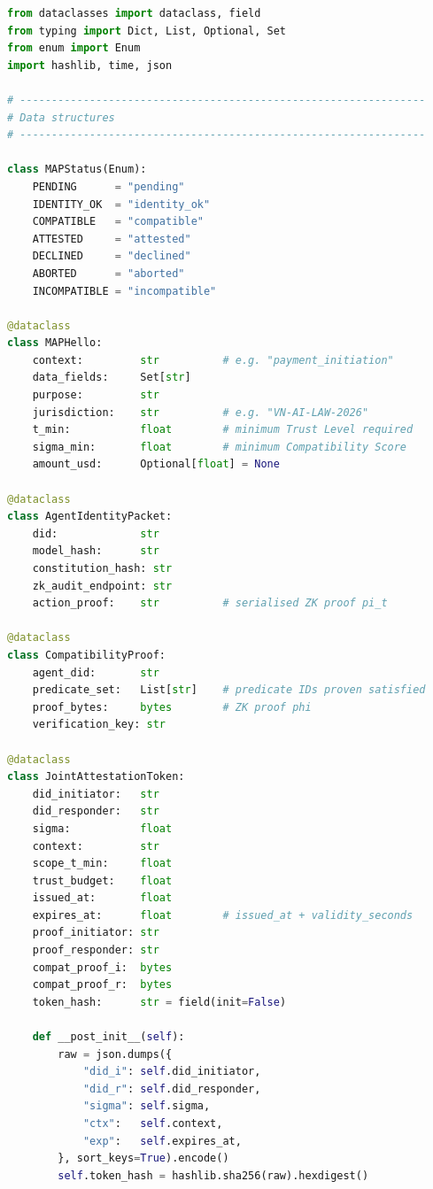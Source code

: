 \begin{lstlisting}[language=Python, style=pythonstyle,
  caption={Mutual Attestation Protocol Controller: implements the
           four-phase MAP handshake, Sovereign Compatibility Score,
           Transitive Trust Budget, and Joint Attestation Token
           generation.},
  label={lst:map-controller}]
from dataclasses import dataclass, field
from typing import Dict, List, Optional, Set
from enum import Enum
import hashlib, time, json

# ----------------------------------------------------------------
# Data structures
# ----------------------------------------------------------------

class MAPStatus(Enum):
    PENDING      = "pending"
    IDENTITY_OK  = "identity_ok"
    COMPATIBLE   = "compatible"
    ATTESTED     = "attested"
    DECLINED     = "declined"
    ABORTED      = "aborted"
    INCOMPATIBLE = "incompatible"

@dataclass
class MAPHello:
    context:         str          # e.g. "payment_initiation"
    data_fields:     Set[str]
    purpose:         str
    jurisdiction:    str          # e.g. "VN-AI-LAW-2026"
    t_min:           float        # minimum Trust Level required
    sigma_min:       float        # minimum Compatibility Score
    amount_usd:      Optional[float] = None

@dataclass
class AgentIdentityPacket:
    did:             str
    model_hash:      str
    constitution_hash: str
    zk_audit_endpoint: str
    action_proof:    str          # serialised ZK proof pi_t

@dataclass
class CompatibilityProof:
    agent_did:       str
    predicate_set:   List[str]    # predicate IDs proven satisfied
    proof_bytes:     bytes        # ZK proof phi
    verification_key: str

@dataclass
class JointAttestationToken:
    did_initiator:   str
    did_responder:   str
    sigma:           float
    context:         str
    scope_t_min:     float
    trust_budget:    float
    issued_at:       float
    expires_at:      float        # issued_at + validity_seconds
    proof_initiator: str
    proof_responder: str
    compat_proof_i:  bytes
    compat_proof_r:  bytes
    token_hash:      str = field(init=False)

    def __post_init__(self):
        raw = json.dumps({
            "did_i": self.did_initiator,
            "did_r": self.did_responder,
            "sigma": self.sigma,
            "ctx":   self.context,
            "exp":   self.expires_at,
        }, sort_keys=True).encode()
        self.token_hash = hashlib.sha256(raw).hexdigest()


\end{lstlisting}
